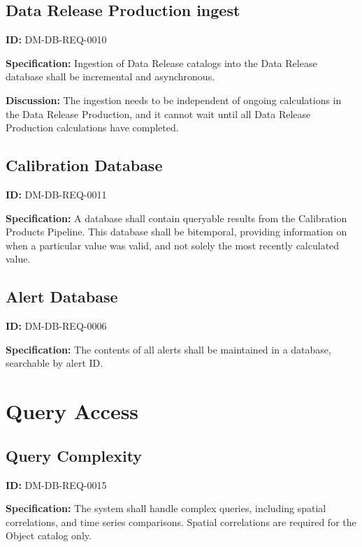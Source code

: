 \documentclass[SE,toc,lsstdraft]{lsstdoc}
\begin{document}
\subsection{Data Release Production ingest}

\label{DM-DB-REQ-0010}
\textbf{ID:} DM-DB-REQ-0010

\textbf{Specification:}
Ingestion of Data Release catalogs into the Data Release database shall be incremental and asynchronous.

\textbf{Discussion:}
The ingestion needs to be independent of ongoing calculations in the Data Release Production, and it cannot wait until all Data Release Production calculations have completed.

\subsection{Calibration Database}

\label{DM-DB-REQ-0011}
\textbf{ID:} DM-DB-REQ-0011

\textbf{Specification:}
A database shall contain queryable results from the Calibration Products Pipeline. This database shall be bitemporal, providing information on when a particular value was valid, and not solely the most recently calculated value.

\subsection{Alert Database}

\label{DM-DB-REQ-0006}
\textbf{ID:} DM-DB-REQ-0006

\textbf{Specification:}
The contents of all alerts shall be maintained in a database, searchable by alert ID.

\section{Query Access}

\subsection{Query Complexity}

\label{DM-DB-REQ-0015}
\textbf{ID:} DM-DB-REQ-0015

\textbf{Specification:}
The system shall handle complex queries, including spatial correlations, and time series comparisons. Spatial correlations are required for the Object catalog only.
\end{document}
